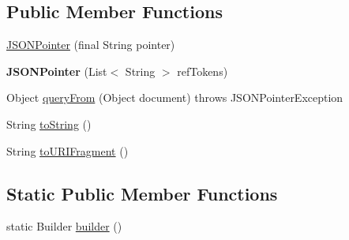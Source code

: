 \subsection*{Public Member Functions}
\begin{DoxyCompactItemize}
\item 
\hyperlink{classorg_1_1json_1_1JSONPointer_a00cf217b565e93e96db4b9e72a5ffd2c}{J\-S\-O\-N\-Pointer} (final String pointer)
\item 
\hypertarget{classorg_1_1json_1_1JSONPointer_ab6c21c4cfbd63415e3618a428448708b}{{\bfseries J\-S\-O\-N\-Pointer} (List$<$ String $>$ ref\-Tokens)}\label{classorg_1_1json_1_1JSONPointer_ab6c21c4cfbd63415e3618a428448708b}

\item 
Object \hyperlink{classorg_1_1json_1_1JSONPointer_a2de9719db18d0f9551a335877c2c7ef7}{query\-From} (Object document)  throws J\-S\-O\-N\-Pointer\-Exception 
\item 
String \hyperlink{classorg_1_1json_1_1JSONPointer_ae41154af3db8013a5f76a5354c08b5a6}{to\-String} ()
\item 
String \hyperlink{classorg_1_1json_1_1JSONPointer_a9c99fdeb3486aea49aed951269f51eda}{to\-U\-R\-I\-Fragment} ()
\end{DoxyCompactItemize}
\subsection*{Static Public Member Functions}
\begin{DoxyCompactItemize}
\item 
static Builder \hyperlink{classorg_1_1json_1_1JSONPointer_a68e413bf609396942ddc056a964acbd5}{builder} ()
\end{DoxyCompactItemize}


